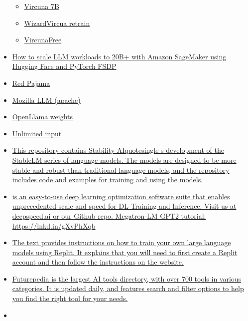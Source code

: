 \begin{itemize}
  \begin{itemize}
   
  \item
    \href{https://github.com/lm-sys/FastChat\#fine-tuning-vicuna-7b-with-local-gpus}{Vircuna
    7B}
  \item
    \href{https://www.reddit.com/r/LocalLLaMA/comments/1376oho/introducing_wizardvicunalm_combining_wizardlm_and/}{WizardVircua
    retrain}
  \item
    \href{https://huggingface.co/reeducator/vicuna-13b-free}{VircunaFree}
  \end{itemize}
\item
  \href{https://www.philschmid.de/sagemaker-fsdp-gpt}{How to scale LLM
  workloads to 20B+ with Amazon SageMaker using Hugging Face and PyTorch
  FSDP}
\item
  \href{https://www.together.xyz/blog/redpajama-models-v1}{Red Pajama}
\item
  \href{https://www.mosaicml.com/blog/mpt-7b}{Mozilla LLM (apache)}
\item
  \href{https://huggingface.co/openlm-research}{OpenLlama weights}
\item
  \href{https://github.com/abertsch72/unlimiformer}{Unlimited input}
\item
  \href{https://github.com/stability-AI/stableLM/}{This repository
  contains Stability AIquotesingle s development of the StableLM
  series of language models. The models are designed to be more stable
  and robust than traditional language models, and the repository
  includes code and examples for training and using the models.}
\item
  \href{https://github.com/microsoft/DeepSpeed}{          is an
  easy-to-use deep learning optimization software suite that enables
  unprecedented scale and speed for DL Training and Inference. Visit us
  at deepspeed.ai or our Github repo.  Megatron-LM GPT2 tutorial:
  https://lnkd.in/gXvPhXqb}
\item
  \href{https://blog.replit.com/llm-training}{The text provides
  instructions on how to train your own large language models using
  Replit. It explains that you will need to first create a Replit
  account and then follow the instructions on the website.}
\item
  \href{http://Futurepedia.io}{Futurepedia is the largest AI tools
  directory, with over 700 tools in various categories. It is updated
  daily, and features search and filter options to help you find the
  right tool for your needs.}
\item

\end{itemize}
